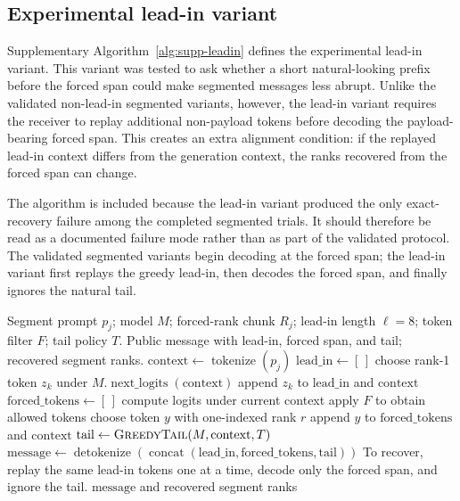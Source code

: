 \documentclass[fleqn,10pt]{wlscirep}
\newcommand{\Tokenize}{\operatorname{tokenize}}
\newcommand{\Detokenize}{\operatorname{detokenize}}
\newcommand{\NextLogits}{\operatorname{next\_logits}}
\begin{document}
\subsection*{Experimental lead-in variant}

Supplementary Algorithm~\ref{alg:supp-leadin} defines the experimental lead-in variant. This variant was tested to ask whether a short natural-looking prefix before the forced span could make segmented messages less abrupt. Unlike the validated non-lead-in segmented variants, however, the lead-in variant requires the receiver to replay additional non-payload tokens before decoding the payload-bearing forced span. This creates an extra alignment condition: if the replayed lead-in context differs from the generation context, the ranks recovered from the forced span can change.

The algorithm is included because the lead-in variant produced the only exact-recovery failure among the completed segmented trials. It should therefore be read as a documented failure mode rather than as part of the validated protocol. The validated segmented variants begin decoding at the forced span; the lead-in variant first replays the greedy lead-in, then decodes the forced span, and finally ignores the natural tail.

\setcounter{algorithm}{0}
\begin{algorithm}[H]
\caption{Experimental lead-in segmented variant}
\label{alg:supp-leadin}
\begin{algorithmic}[1]
\Require Segment prompt \(p_j\); model \(M\); forced-rank chunk \(R_j\); lead-in length \(\ell=8\); token filter \(F\); tail policy \(T\).
\Ensure Public message with lead-in, forced span, and tail; recovered segment ranks.
\State \(\mathrm{context} \gets \Tokenize(p_j)\)
\State \(\mathrm{lead\_in} \gets [\,]\)
    \State choose rank-1 token \(z_k\) under \(M.\NextLogits(\mathrm{context})\)
    \State append \(z_k\) to \(\mathrm{lead\_in}\) and \(\mathrm{context}\)
\EndFor
\State \(\mathrm{forced\_tokens} \gets [\,]\)
    \State compute logits under current context
    \State apply \(F\) to obtain allowed tokens
    \State choose token \(y\) with one-indexed rank \(r\)
    \State append \(y\) to \(\mathrm{forced\_tokens}\) and \(\mathrm{context}\)
\EndFor
\State \(\mathrm{tail} \gets \Call{GreedyTail}{M,\mathrm{context},T}\)
\State \(\mathrm{message} \gets \Detokenize(\operatorname{concat}(\mathrm{lead\_in},\mathrm{forced\_tokens},\mathrm{tail}))\)
\Statex
\State To recover, replay the same lead-in tokens one at a time, decode only the forced span, and ignore the tail.
\State \Return \(\mathrm{message}\) and recovered segment ranks
\end{algorithmic}
\end{algorithm}
\end{document}
